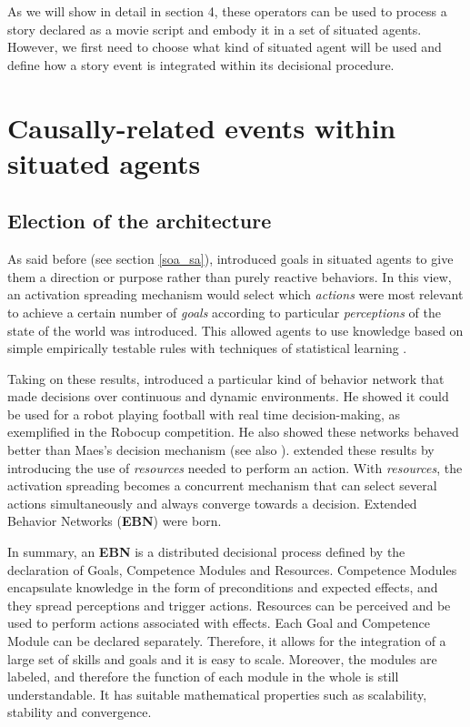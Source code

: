 \documentclass[
		twoside,openright,titlepage,numbers=noenddot,manychapters,
		headinclude,%
                footinclude=false,cleardoublepage=empty,
                BCOR=5mm,
		fontsize=11pt, %
                 enabledeprecatedfontcommands]{scrreprt}
\begin{document}
As we will show in detail in section 4, these operators can be used to process a story declared as a movie script and embody it in a set of situated agents. However, we first need to choose what kind of situated agent will be used and define how a story event is integrated within its decisional procedure.



\section{Causally-related events within situated agents}
\subsection{Election of the architecture}
As said before (see section \ref{soa_sa}), \cite{Maes1989} introduced goals in situated agents to give them a direction or purpose rather than purely reactive behaviors. In this view, an activation spreading mechanism would select which \emph{actions} were most relevant to achieve a certain number of \emph{goals} according to particular \emph{perceptions} of the state of the world was introduced. This allowed agents to use knowledge based on simple empirically testable rules with techniques of statistical learning \cite[]{maes1991ana}.

Taking on these results, \cite{dorer1999bnc} introduced a particular kind of behavior network that made decisions over continuous and dynamic environments. He showed it could be used for a robot playing football with real time decision-making, as exemplified in the Robocup competition. He also showed these networks behaved better than Maes’s decision mechanism (see also \cite{nebel2004behaviour}). \cite{dorer2004ebn} extended these results by introducing the use of \emph{resources} needed to perform an action. With \emph{resources}, the activation spreading becomes a concurrent mechanism that can select several actions simultaneously and always converge towards a decision. Extended Behavior Networks (\textbf{EBN}) were born. 


In summary, an \textbf{EBN} is a distributed decisional process defined by the declaration of Goals, Competence Modules and Resources. 
Competence Modules encapsulate knowledge in the form of preconditions and expected effects, and they spread perceptions and trigger actions.  Resources can be perceived and be used to perform actions associated with effects. 
 Each Goal and Competence Module can be declared separately. Therefore, it allows for the integration of a large set of skills and goals and it is easy to scale. Moreover, the modules are labeled, and therefore the function of each module in the whole is still understandable. It has suitable mathematical properties such as scalability, stability and convergence.
 
\end{document}
